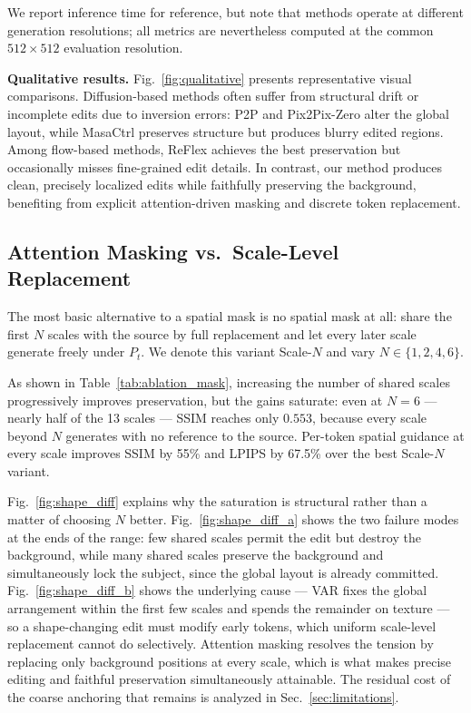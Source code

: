 We report inference time for reference, but note that methods operate at different generation resolutions; all metrics are nevertheless computed at the common $512\times512$ evaluation resolution.



\noindent\textbf{Qualitative results.}
Fig.~\ref{fig:qualitative} presents representative visual comparisons. Diffusion-based methods often suffer from structural drift or incomplete edits due to inversion errors: P2P and Pix2Pix-Zero alter the global layout, while MasaCtrl preserves structure but produces blurry edited regions. Among flow-based methods, ReFlex achieves the best preservation but occasionally misses fine-grained edit details. In contrast, our method produces clean, precisely localized edits while faithfully preserving the background, benefiting from explicit attention-driven masking and discrete token replacement.

\subsection{Attention Masking vs.\ Scale-Level Replacement}
\label{sec:ablation_mask}

The most basic alternative to a spatial mask is no spatial mask at all: share the first $N$ scales with the source by full replacement and let every later scale generate freely under $P_t$. We denote this variant Scale-$N$ and vary $N \in \{1, 2, 4, 6\}$.




As shown in Table~\ref{tab:ablation_mask}, increasing the number of shared scales progressively improves preservation, but the gains saturate: even at $N{=}6$ --- nearly half of the 13 scales --- SSIM reaches only $0.553$, because every scale beyond $N$ generates with no reference to the source. Per-token spatial guidance at every scale improves SSIM by 55\% and LPIPS by 67.5\% over the best Scale-$N$ variant.

Fig.~\ref{fig:shape_diff} explains why the saturation is structural rather than a matter of choosing $N$ better. Fig.~\ref{fig:shape_diff_a} shows the two failure modes at the ends of the range: few shared scales permit the edit but destroy the background, while many shared scales preserve the background and simultaneously lock the subject, since the global layout is already committed. Fig.~\ref{fig:shape_diff_b} shows the underlying cause --- VAR fixes the global arrangement within the first few scales and spends the remainder on texture --- so a shape-changing edit must modify early tokens, which uniform scale-level replacement cannot do selectively. Attention masking resolves the tension by replacing only background positions at every scale, which is what makes precise editing and faithful preservation simultaneously attainable. The residual cost of the coarse anchoring that remains is analyzed in Sec.~\ref{sec:limitations}.

